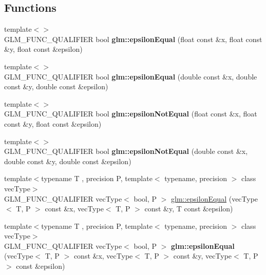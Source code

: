 \subsection*{Functions}
\begin{DoxyCompactItemize}
\item 
{\footnotesize template$<$$>$ }\\G\+L\+M\+\_\+\+F\+U\+N\+C\+\_\+\+Q\+U\+A\+L\+I\+F\+I\+ER bool {\bfseries glm\+::epsilon\+Equal} (float const \&x, float const \&y, float const \&epsilon)\hypertarget{namespaceglm_aded5e7ea9a0eacd03367ad77986c2a15}{}\label{namespaceglm_aded5e7ea9a0eacd03367ad77986c2a15}

\item 
{\footnotesize template$<$$>$ }\\G\+L\+M\+\_\+\+F\+U\+N\+C\+\_\+\+Q\+U\+A\+L\+I\+F\+I\+ER bool {\bfseries glm\+::epsilon\+Equal} (double const \&x, double const \&y, double const \&epsilon)\hypertarget{namespaceglm_a6e30ea38a0e3ebc25d87e667255057e5}{}\label{namespaceglm_a6e30ea38a0e3ebc25d87e667255057e5}

\item 
{\footnotesize template$<$$>$ }\\G\+L\+M\+\_\+\+F\+U\+N\+C\+\_\+\+Q\+U\+A\+L\+I\+F\+I\+ER bool {\bfseries glm\+::epsilon\+Not\+Equal} (float const \&x, float const \&y, float const \&epsilon)\hypertarget{namespaceglm_af4127d65f4afc6e447d461bae25f90fe}{}\label{namespaceglm_af4127d65f4afc6e447d461bae25f90fe}

\item 
{\footnotesize template$<$$>$ }\\G\+L\+M\+\_\+\+F\+U\+N\+C\+\_\+\+Q\+U\+A\+L\+I\+F\+I\+ER bool {\bfseries glm\+::epsilon\+Not\+Equal} (double const \&x, double const \&y, double const \&epsilon)\hypertarget{namespaceglm_a68d8ce38812c8599018e404afc79f088}{}\label{namespaceglm_a68d8ce38812c8599018e404afc79f088}

\item 
{\footnotesize template$<$typename T , precision P, template$<$ typename, precision $>$ class vec\+Type$>$ }\\G\+L\+M\+\_\+\+F\+U\+N\+C\+\_\+\+Q\+U\+A\+L\+I\+F\+I\+ER vec\+Type$<$ bool, P $>$ \hyperlink{group__gtc__epsilon_gaca9443f217dc36587624247245522331}{glm\+::epsilon\+Equal} (vec\+Type$<$ T, P $>$ const \&x, vec\+Type$<$ T, P $>$ const \&y, T const \&epsilon)
\item 
{\footnotesize template$<$typename T , precision P, template$<$ typename, precision $>$ class vec\+Type$>$ }\\G\+L\+M\+\_\+\+F\+U\+N\+C\+\_\+\+Q\+U\+A\+L\+I\+F\+I\+ER vec\+Type$<$ bool, P $>$ {\bfseries glm\+::epsilon\+Equal} (vec\+Type$<$ T, P $>$ const \&x, vec\+Type$<$ T, P $>$ const \&y, vec\+Type$<$ T, P $>$ const \&epsilon)\hypertarget{namespaceglm_abc7f87cb473f9c9d7d6109e96c139807}{}\label{namespaceglm_abc7f87cb473f9c9d7d6109e96c139807}


\end{DoxyCompactItemize}

